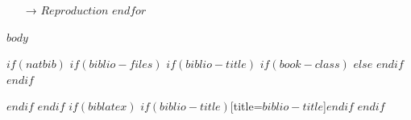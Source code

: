 \documentclass[10pt,a4paper,onecolumn]{article}
\begin{document}
\begin{rebox}
\small
\begin{flushleft}
\begin{itemize}
  $for(Reproduction)$
  \item[→] $Reproduction$
  $endfor$
\end{itemize}\par
\end{flushleft}
\end{rebox}


$body$

{\sffamily \small
$if(natbib)$
  $if(biblio-files)$
    $if(biblio-title)$
      $if(book-class)$
        \renewcommand\bibname{$biblio-title$}
      $else$
        \renewcommand\refname{$biblio-title$}
      $endif$
    $endif$
    
  $endif$
$endif$
$if(biblatex)$
  \printbibliography$if(biblio-title)$[title=$biblio-title$]$endif$
$endif$
}
\end{document}
